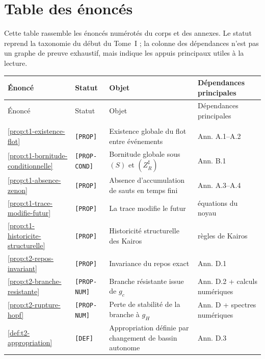 \chapter*{Table des énoncés}

Cette table rassemble les énoncés numérotés du corps et des annexes. Le statut reprend la taxonomie du début du Tome~I ; la colonne des dépendances n'est pas un graphe de preuve exhaustif, mais indique les appuis principaux utiles à la lecture.

\begingroup
\scriptsize
\setlength{\tabcolsep}{3pt}
\renewcommand{\arraystretch}{1.08}
\begin{longtable}{@{}p{}p{}p{}p{}@{}}
\toprule
Énoncé & Statut & Objet & Dépendances principales \\
\midrule
\endfirsthead
\toprule
Énoncé & Statut & Objet & Dépendances principales \\
\midrule
\endhead
\bottomrule
\endfoot
\multicolumn{4}{@{}l}{\textbf{Corps du texte}}\\[1pt]
\ref{prop:t1-existence-flot} & \texttt{{[}PROP{]}} & Existence globale du flot entre événements & Ann. A.1--A.2 \\
\ref{prop:t1-bornitude-conditionnelle} & \texttt{{[}PROP-COND{]}} & Bornitude globale sous $(S)$ et $(Z_R^\sharp)$ & Ann. B.1 \\
\ref{prop:t1-absence-zenon} & \texttt{{[}PROP{]}} & Absence d'accumulation de sauts en temps fini & Ann. A.3--A.4 \\
\ref{prop:t1-trace-modifie-futur} & \texttt{{[}PROP{]}} & La trace modifie le futur & équations du noyau \\
\ref{prop:t1-historicite-structurelle} & \texttt{{[}PROP{]}} & Historicité structurelle des Kairos & règles de Kairos \\
\ref{prop:t2-repos-invariant} & \texttt{{[}PROP{]}} & Invariance du repos exact & Ann. D.1 \\
\ref{prop:t2-branche-resistante} & \texttt{{[}PROP-NUM{]}} & Branche résistante issue de $g_c$ & Ann. D.2 + calculs numériques \\
\ref{prop:t2-rupture-hopf} & \texttt{{[}PROP-NUM{]}} & Perte de stabilité de la branche à $g_H$ & Ann. D + spectres numériques \\
\ref{def:t2-appropriation} & \texttt{{[}DEF{]}} & Appropriation définie par changement de bassin autonome & Ann. D.3 \\

\end{longtable}

